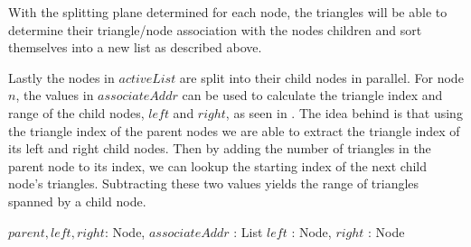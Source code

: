 With the splitting plane determined for each node, the triangles will be able to
determine their triangle/node association with the nodes children and sort
themselves into a new list as described above.


Lastly the nodes in $activeList$ are split into their child nodes in
parallel. For node $n$, the values in $associateAddr$ can be used to calculate
the triangle index and range of the child nodes, $left$ and $right$, as seen in
. The idea behind  is that
using the triangle index of the parent nodes we are able to extract the triangle
index of its left and right child nodes. Then by adding the number of triangles
in the parent node to its index, we can lookup the starting index of the next
child node's triangles. Subtracting these two values yields the range of
triangles spanned by a child node.

\begin{algorithm}
  \caption{Compute child node triangle index and range}
  \label{alg:childIndices}
  \begin{algorithmic}
              {$parent, left, right$: Node, $associateAddr$ : List}
              {$left$ : Node, $right$ : Node}{
              }
  \end{algorithmic}
\end{algorithm}







